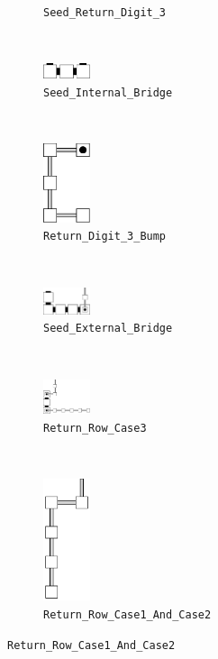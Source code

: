 \begin{figure}[H]
\begin{subfigure}[t]{0.25\textwidth}
        \caption{\label{fig:seed_return_digit_3} {\tt Seed\_Return\_Digit\_3}}
    \end{subfigure}%
    ~
    \begin{subfigure}[t]{0.25\textwidth}
        \centering
        \includegraphics[width=0.15\textwidth]{seed/seed_internal_bridge}
        \caption{\label{fig:seed_internal_bridge} {\tt Seed\_Internal\_Bridge}}
    \end{subfigure}%
    ~

    \begin{subfigure}[t]{0.25\textwidth}
        \centering
        \includegraphics[width=0.15\textwidth]{seed/seed_return_digit_3_bump}
        \caption{\label{fig:return_digit_3_bump} {\tt Return\_Digit\_3\_Bump}}
    \end{subfigure}%
    ~
    \begin{subfigure}[t]{0.25\textwidth}
        \centering
        \includegraphics[width=0.15\textwidth]{seed/seed_external_bridge}
        \caption{\label{fig:seed_external_bridge} {\tt Seed\_External\_Bridge}}
    \end{subfigure}%
    ~
    \begin{subfigure}[t]{0.25\textwidth}
        \centering
        \includegraphics[width=0.15\textwidth]{seed/seed_return_row_case3}
        \caption{\label{fig:seed_return_row_case3} {\tt Return\_Row\_Case3}}
    \end{subfigure}%
    ~
    \begin{subfigure}[t]{0.25\textwidth}
        \centering
        \includegraphics[width=0.15\textwidth]{seed/seed_return_row_case1_and_case2}
        \caption{\label{fig:seed_return_row_case1_and_case2} {\tt Return\_Row\_Case1\_And\_Case2}}
    \end{subfigure}%
\end{figure}

